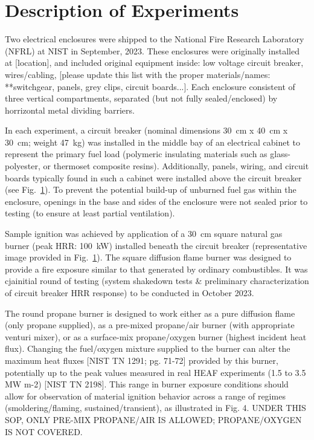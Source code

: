 \documentclass[12pt]{article}
\begin{document}
\section{Description of Experiments}


Two electrical enclosures were shipped to the National Fire Research Laboratory (NFRL) at NIST in September, 2023. These enclosures were originally installed at [location], and included original equipment inside: low voltage circuit breaker, wires/cabling, [please update this list with the proper materials/names: **switchgear, panels, grey clips, circuit boards...]. Each enclosure consistent of three vertical compartments, separated (but not fully sealed/enclosed) by horrizontal metal dividing barriers.

In each experiment, a circuit breaker (nominal dimensions 30~cm x 40~cm x 30~cm; weight 47~kg) was installed in the middle bay of an electrical cabinet to represent the primary fuel load (polymeric insulating materials such as glass-polyester, or thermoset composite resins). Additionally, panels, wiring, and circuit boards typically found in such a cabinet were installed above the circuit breaker (see Fig.~\ref{}). To prevent the potential build-up of unburned fuel gas within the enclosure, openings in the base and sides of the enclosure were not sealed prior to testing (to ensure at least partial ventilation).

Sample ignition was achieved by application of a 30~cm square natural gas burner (peak HRR: 100~kW) installed beneath the circuit breaker (representative image provided in Fig.~\ref{}). The square diffusion flame burner was designed to provide a fire exposure similar to that generated by ordinary combustibles\cite{}. It was cjainitial round of testing (system shakedown tests & preliminary characterization of circuit breaker HRR response) to be conducted in October 2023.

The round propane burner is designed to work either as a pure diffusion flame (only propane supplied), as a pre-mixed propane/air burner (with appropriate venturi mixer), or as a surface-mix propane/oxygen burner (highest incident heat flux). Changing the fuel/oxygen mixture supplied to the burner can alter the maximum heat fluxes [NIST TN 1291; pg. 71-72] provided by this burner, potentially up to the peak values measured in real HEAF experiments (1.5 to 3.5 MW m-2) [NIST TN 2198]. This range in burner exposure conditions should allow for observation of material ignition behavior across a range of regimes (smoldering/flaming, sustained/transient), as illustrated in Fig. 4. UNDER THIS SOP, ONLY PRE-MIX PROPANE/AIR IS ALLOWED; PROPANE/OXYGEN IS NOT COVERED.
\end{document}
